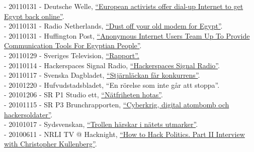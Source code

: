 \documentclass[a4paper,11pt,oneside]{article}
\begin{document}
    - 20110131 - Deutsche Welle, \href{http://www.dw.com/en/european-activists-offer-dial-up-internet-to-get-egypt-back-online/a-14807049}{``European activists offer dial-up Internet to get Egypt back online''}. \\
    - 20110131 - Radio Netherlands, \href{http://www.rnw.nl/english/article/dust-your-dialup-modem-contact-egypt}{``Dust off your old modem for Egypt''}. \\
    - 20110131 - Huffington Post,  \href{http://www.huffingtonpost.com/2011/01/29/anonymous-internet-egypt_n_815889.html}{``Anonymous Internet Users Team Up To Provide Communication Tools For Egyptian People''}. \\
    - 20110129 - Sveriges Television, \href{http://www.youtube.com/watch?v=HRZ0QKyiFsE&amp;feature=related}{``Rapport''.} \\
    - 20110114 - Hackerspaces Signal Radio, \href{http://signal.hackerspaces.org/archive/2011-01-13-2200-hacktivism-hour.mp3}{``Hackerspaces Signal Radio''}. \\
    - 20110117 - Svenska Dagbladet,  \href{http://www.svd.se/stjarnlackan-far-konkurrens}{``Stjärnläckan får konkurrens''}. \\
    - 20101220 - Hufvudstadsbladet, ``En rörelse som inte går att stoppa''.\\
    - 20101206 - SR P1 Studio ett, \href{http://t.sr.se/1CQkYCj}{``Nätfriheten hotas''}. \\
    - 20101115 - SR P3 Brunchrapporten, \href{http://t.sr.se/RI5PTm}{``Cyberkrig, digital atombomb och hackersoldater''}. \\
    - 20101017 - Sydsvenskan, \href{http://www.sydsvenskan.se/2010-10-17/trollen-harskar-i-natets-utmarker}{``Trollen härskar i nätets utmarker''}. \\
    - 20100611 - NRLI TV @ Hacknight, \href{http://www.youtube.com/watch?v=VhmH6cJZS4k&amp;feature=related}{``How to Hack Politics. Part II Interview with Christopher Kullenberg''}. \\
\end{document}
